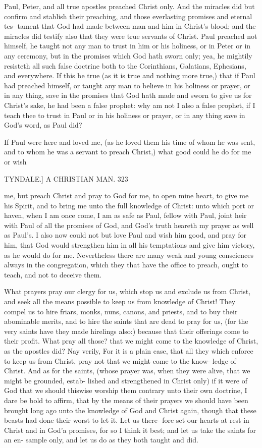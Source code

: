 \documentclass{custom}
\begin{document}
{Paul, Peter, and all true apostles preached Christ only.
And the miracles did but confirm and stablish their
preaching, and those everlasting promises and eternal tes-
tament that God had made between man and him in
Christ's blood; and the miracles did testify also that they 
were true servants of Christ. Paul preached not himself,
he taught not any man to trust in him or his holiness, or in
Peter or in any ceremony, but in the promises which God 
hath sworn only; yea, he mightily resisteth all such false
doctrine both to the Corinthians, Galatians, Ephesians,
and everywhere. If this be true (as it is true and nothing 
more true,) that if Paul had preached himself, or taught 
any man to believe in his holiness or prayer, or in any thing,
save in the promises that God hath made and sworn to
give us for Christ's sake, he had been a false prophet:
why am not I also a false prophet, if I teach thee to trust 
in Paul or in his holiness or prayer, or in any thing save 
in God's word, as Paul did? 

If Paul were here and loved me, (as he loved them 
his time of whom he was sent, and to whom he was a servant 
to preach Christ,) what good could he do for me or wish 


TYNDALE.]
A CHRISTIAN MAN.
323

me, but preach Christ and pray to God for me, to open 
mine heart, to give me his Spirit, and to bring me unto the 
full knowledge of Christ: unto which port or haven, when 
I am once come, I am as safe as Paul, fellow with Paul, 
joint heir with Paul of all the promises of God, and God's 
truth heareth my prayer as well as Paul's. I also now could 
not but love Paul and wish him good, and pray for him, 
that God would strengthen him in all his temptations and 
give him victory, as he would do for me. Nevertheless 
there are many weak and young consciences always in 
the congregation, which they that have the office to preach, 
ought to teach, and not to deceive them. 

What prayers pray our clergy for us, which stop us and 
exclude us from Christ, and seek all the means possible to 
keep us from knowledge of Christ! They compel us to 
hire friars, monks, nuns, canons, and priests, and to 
buy their abominable merits, and to hire the saints that 
are dead to pray for us, (for the very saints have they made 
hirelings also:) because that their offerings come to their 
profit. What pray all those? that we might come to the 
knowledge of Christ, as the apostles did? Nay verily, For 
it is a plain case, that all they which enforce to keep us 
from Christ, pray not that we might come to the know- 
ledge of Christ. And as for the saints, (whose prayer was, 
when they were alive, that we might be grounded, estab- 
lished and strengthened in Christ only) if it were of God 
that we should thiswise worship them contrary unto their 
own doctrine, I dare be bold to affirm, that by the means 
of their prayers we should have been brought long ago 
unto the knowledge of God and Christ again, though that 
these beasts had done their worst to let it. Let us there- 
fore set our hearts at rest in Christ and in God'a promises, 
for so I think it best; and let us take the saints for an en- 
sample only, and let us do as they both taught and did. 

}
\end{document}
